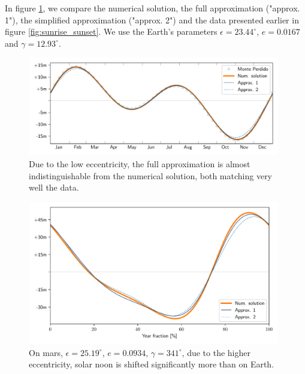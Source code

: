 \documentclass[12pt]{article}
\begin{document}
In figure \ref{fig:noon_computed_Earth}, we compare the numerical solution, 
the full approximation ("approx. 1"), the simplified approximation 
("approx. 2") and the data presented earlier in figure \ref{fig:sunrise_sunset}. 
We use the Earth's parameters $\epsilon=23.44^\circ$, $e=0.0167$ and
$\gamma=12.93^\circ$.

\begin{figure}[h]
    \centering
    \includegraphics[width=0.98\textwidth]{./noon_computed_Earth.pdf}
    \caption{
        Due to the low eccentricity, the full approximation is almost 
        indistinguishable from the numerical solution, both matching very 
        well the data.
    }
    \label{fig:noon_computed_Earth}
\end{figure}

\begin{figure}[ht]
    \centering
    \includegraphics[width=0.98\textwidth]{./noon_computed_Mars.pdf}
    \caption{
        On mars, $\epsilon=25.19^\circ$, $e=0.0934$, $\gamma=341^\circ$, 
        due to the higher eccentricity, solar noon is shifted significantly 
        more than on Earth.
    }
    \label{fig:noon_computed_Mars}
\end{figure}
\end{document}
